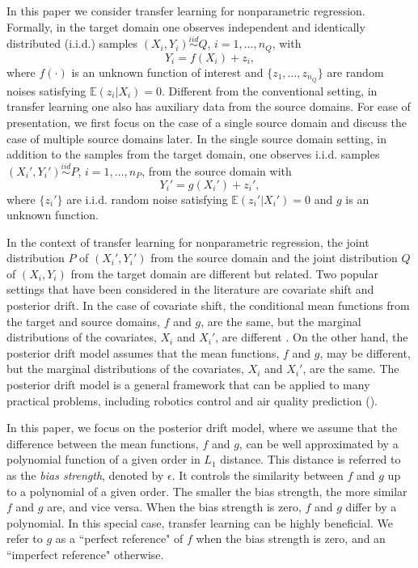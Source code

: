 \documentclass{article}
\def\E{\mathbb{E}}
\begin{document}
In this paper we consider transfer learning for nonparametric regression. Formally, in the target domain one observes independent and identically distributed (i.i.d.)  samples $(X_{i},Y_{i})\stackrel{iid}{\sim} Q$, $i=1,\dots,n_Q$,  with
$$Y_i = f(X_i)+z_i,$$
where $f(\cdot)$ is an unknown function of interest and  $\{z_1,\dots,z_{n_Q}\}$ are  random noises satisfying $\E (z_i |X_i)=0$. Different from the conventional setting, in transfer learning one also has auxiliary data from the source domains. For ease of presentation, we first focus on the case of a single source domain and discuss the case of multiple source domains later. In the single source domain setting, in addition to the samples from the target domain, one observes i.i.d. samples $(X_{i}',Y_{i}')\stackrel{iid}{\sim} P$, $i=1,\dots,n_{P}$, from the source domain with
$$Y_{i}'= g(X_{i}')+z_{i}',$$
where $\{z_{i}'\}$ are i.i.d. random noise satisfying $\E (z_{i}'|X_{i}')=0$ and $g$ is an unknown function. 

In the context of transfer learning for nonparametric regression, the joint distribution $P$ of  $(X_{i}',Y_{i}')$ from the source domain and the joint distribution $Q$ of $(X_i,Y_i)$ from the target domain are different but related. Two popular settings that have been considered in the literature are covariate shift and posterior drift. In the case of covariate shift, the conditional mean functions from the target and source domains, $f$ and $g$, are the same, but the marginal distributions of the covariates, $X_i$ and $X_i'$, are different \citep{shimodaira2000improving, huang2006correcting, wen2014robust}. On the other hand, the posterior drift model assumes that the mean functions, $f$ and $g$, may be different, but the marginal distributions of the covariates, $X_i$ and $X_i'$, are the same. The posterior drift model is a general framework that can be applied to many practical problems, including robotics control \citep{vijayakumar2002statistical, nguyen2008learning, nguyen2008computed, yeung2009learning, cao2010adaptive} and  air quality prediction (\citealp{mei2014inferring, wang2016nonparametric}).  
 
 In this paper, we focus on the posterior drift model, where we assume that the difference between the mean functions, $f$ and $g$, can be well approximated by a polynomial function of a given order in $L_1$ distance. This distance is referred to as the \emph{bias strength}, denoted by $\epsilon$. It controls the similarity between $f$ and $g$ up to a polynomial of a given order. The smaller the bias strength, the more similar $f$ and $g$ are, and vice versa. When the bias strength is zero, $f$ and $g$ differ by a polynomial. In this special case, transfer learning can be highly beneficial.
We refer to $g$ as a ``perfect reference" of $f$ when the bias strength is zero, and an ``imperfect reference" otherwise.
\end{document}

